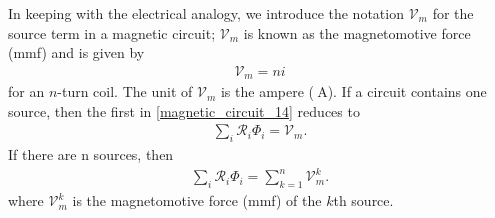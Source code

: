 \documentclass[12pt,a4paper,oneside]{book}
\begin{document}
\begin{onehalfspace}
In keeping with the electrical analogy, we introduce the notation $\mathscr{V}_m$ for the source term in a magnetic circuit; $\mathscr{V}_m$ is known as the magnetomotive force (mmf) and is given by
\begin{equation}\label{magnetic_circuit_15}
	{\begin{aligned}
			\mathscr{V}_m=ni
	\end{aligned}}
\end{equation} 
for an $n$-turn coil. The unit of $\mathscr{V}_m$ is the ampere ($\SI{}{\ampere}$). If a circuit contains one source, then the first in \ref{magnetic_circuit_14} reduces to 
\begin{equation}\label{magnetic_circuit_16}
	{\begin{aligned}
			\sum_{i}\mathscr{R}_i\Phi_i=\mathscr{V}_m.
	\end{aligned}}
\end{equation} 
If there are n sources, then
\begin{equation}\label{magnetic_circuit_17}
	{\begin{aligned}
			\sum_{i}\mathscr{R}_i\Phi_i=\sum_{k=1}^{n}\mathscr{V}_m^k.
	\end{aligned}}
\end{equation} 
where $\mathscr{V}_m^k$ is the magnetomotive force (mmf) of the $k$th source.


\end{onehalfspace}
\end{document}

